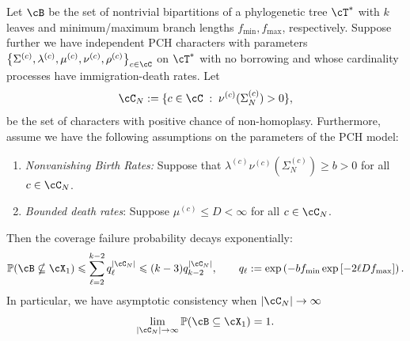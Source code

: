 \begin{theorem}
\label{thm:canby_bipartition_cover_bounds_no_borrowing}
Let $\cB$ be the set of nontrivial bipartitions of a phylogenetic tree $\cT^*$ with $k$ leaves
and minimum/maximum branch lengths $f_{\min}, f_{\max}$, respectively. Suppose further
we have independent PCH characters with parameters
$\left\{\Sigma^{(c)}, \lambda^{(c)}, \mu^{(c)}, \nu^{(c)}, \rho^{(c)}\right\}_{c \in \cC}$
on $\cT^*$ with no borrowing and whose cardinality processes have immigration-death rates. Let
%
\[\cC_N := \{c \in \cC \; : \; \nu^{(c)}(\Sigma_N^{(c)}) > 0\},\]
%
\noindent be the set of characters with positive chance of non-homoplasy.
 Furthermore, assume we have the following assumptions on the parameters of the PCH model:

\begin{enumerate}

    \item[(i)] \textit{Nonvanishing Birth Rates:} Suppose that $\lambda^{(c)} \nu^{(c)}(\Sigma_N^{(c)}) \geq b > 0$ for all $c \in \cC_N$.

    \item[(ii)] \textit{Bounded death rates}: Suppose $\mu^{(c)} \leq D < \infty$ for all $c \in \cC_N$.
\end{enumerate}
%
\noindent Then the coverage failure probability decays exponentially:
%
\[\P(\cB \nsubseteq \cX_1)  \leq\sum_{\ell=2}^{k-2} q_\ell^{|\cC_N|} \leq (k-3)q_{k-2}^{|\cC_N|},\qquad q_\ell := \exp\left(-bf_{\min} \exp\left[-2\ell Df_{\max}\right]\right).\]
%
\noindent In particular, we have asymptotic consistency when $|\cC_N| \to \infty$
%
\[\lim_{|\cC_N| \to \infty} \P(\cB \subseteq \cX_1) = 1.\]
%
\end{theorem}
%
